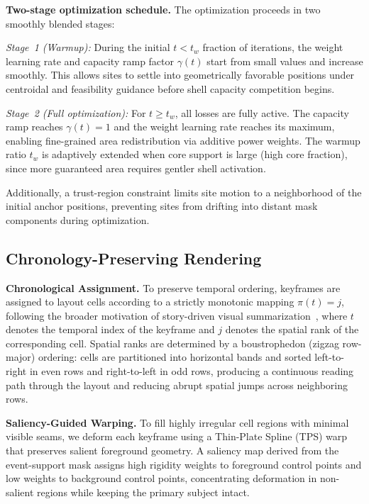 \vspace{1mm}
\noindent\textbf{Two-stage optimization schedule.}
\label{subsec:schedule}
The optimization proceeds in two smoothly blended stages:

\emph{Stage~1 (Warmup):} During the initial $t < t_w$ fraction of iterations, the weight learning rate and capacity ramp factor $\gamma(t)$ start from small values and increase smoothly. This allows sites to settle into geometrically favorable positions under centroidal and feasibility guidance before shell capacity competition begins.

\emph{Stage~2 (Full optimization):} For $t \geq t_w$, all losses are fully active. The capacity ramp reaches $\gamma(t)=1$ and the weight learning rate reaches its maximum, enabling fine-grained area redistribution via additive power weights. The warmup ratio $t_w$ is adaptively extended when core support is large (high core fraction), since more guaranteed area requires gentler shell activation.

Additionally, a trust-region constraint limits site motion to a neighborhood of the initial anchor positions, preventing sites from drifting into distant mask components during optimization.

\subsection{Chronology-Preserving Rendering}
\label{subsec:composition}

\textbf{Chronological Assignment.}
To preserve temporal ordering, keyframes are assigned to layout
cells according to a strictly monotonic mapping $\pi(t)=j$,
following the broader motivation of story-driven visual summarization~\cite{lu2013story},
where $t$ denotes the temporal index of the keyframe and $j$ denotes
the spatial rank of the corresponding cell. Spatial ranks are determined
by a boustrophedon (zigzag row-major) ordering: cells are partitioned
into horizontal bands and sorted left-to-right in even rows and
right-to-left in odd rows, producing a continuous reading path through
the layout and reducing abrupt spatial jumps across neighboring rows.

\textbf{Saliency-Guided Warping.}
To fill highly irregular cell regions with minimal visible seams,
we deform each keyframe using a Thin-Plate Spline (TPS) warp~\cite{bookstein2002principal} that
preserves salient foreground geometry. A saliency map derived from
the event-support mask assigns high rigidity weights to foreground
control points and low weights to background control points,
concentrating deformation in non-salient regions while keeping
the primary subject intact.

